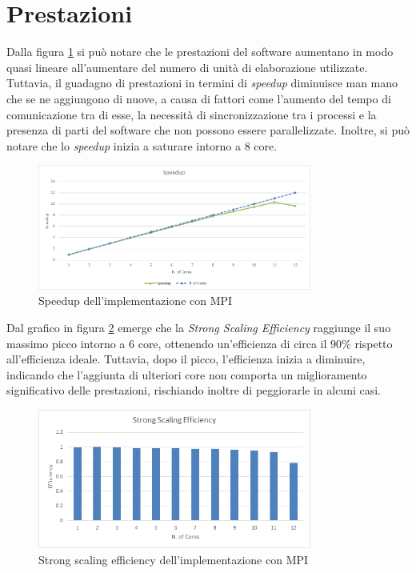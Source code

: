 \documentclass[a4paper, 12pt]{report}
\begin{document}
\section*{Prestazioni}
\begin{sloppypar}
  \noindent
  Dalla figura \ref{fig:mpi_speedup} si può notare che le prestazioni del software aumentano in modo 
  quasi lineare all'aumentare del numero di unità di elaborazione utilizzate. Tuttavia, il guadagno di prestazioni in 
  termini di \textit{speedup} diminuisce man mano che se ne aggiungono di nuove, a causa di fattori come l'aumento 
  del tempo di comunicazione tra di esse, la necessità di sincronizzazione tra i processi e la presenza di 
  parti del software che non possono essere parallelizzate. Inoltre, si può notare che lo \textit{speedup} 
  inizia a saturare intorno a 8 core.

  \begin{figure}[ht]
    \centering
    \includegraphics[width=9cm]{img/mpi-speedup.png}
    \caption{Speedup dell'implementazione con MPI}
    \label{fig:mpi_speedup}
  \end{figure}

  \noindent
  Dal grafico in figura \ref{fig:mpi_sse} emerge che la \textit{Strong Scaling Efficiency} raggiunge il suo 
  massimo picco intorno a 6 core, ottenendo un'efficienza di circa il 90\% rispetto all'efficienza ideale. 
  Tuttavia, dopo il picco, l'efficienza inizia a diminuire, indicando che l'aggiunta di ulteriori core non 
  comporta un miglioramento significativo delle prestazioni, rischiando inoltre di peggiorarle in alcuni casi.

  \begin{figure}[ht]
    \centering
    \includegraphics[width=9cm]{img/mpi-sse.png}
    \caption{Strong scaling efficiency dell'implementazione con MPI}
    \label{fig:mpi_sse}
  \end{figure}


\end{sloppypar}
\end{document}
